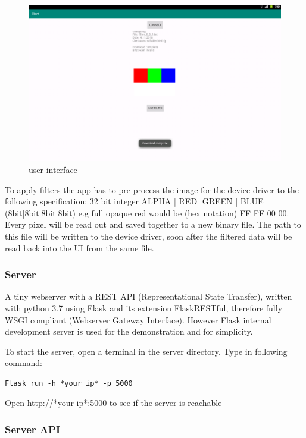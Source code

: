 \begin{figure}[htbp]
\centering
\includegraphics[width=1\textwidth]{sections/methodology/clientdownload.png}
\caption{\label{fig:gui} user interface}
\end{figure}

To apply filters the app has to pre process the image for the device driver to the following specification:
32 bit integer
ALPHA | RED |GREEN | BLUE (8bit|8bit|8bit|8bit) e.g full opaque red would be (hex notation) FF FF 00 00. Every pixel will be read out and saved together to a new binary file. 
The path to this file will be written to the device driver, soon after the filtered data will be read back into the UI from the same file.


\subsubsection{Server}

A tiny webserver with a REST API (Representational State Transfer), 
written with python 3.7 using Flask and its extension FlaskRESTful, therefore fully WSGI compliant
(Webserver Gateway Interface). However Flask internal development server is used for the demonstration and for simplicity.

To start the server, open a terminal in the server directory. Type in following command:
\begin{verbatim}
Flask run -h *your ip* -p 5000    
\end{verbatim}
Open http://*your ip*:5000 to see if the server is reachable

\subsubsection{Server API}

